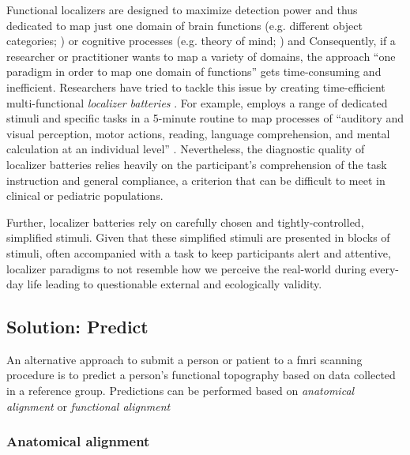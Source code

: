 Functional localizers are designed to maximize detection power and thus
dedicated to map just one domain of brain functions (e.g. different object
categories; \citet{kanwisher1997ffa}) or cognitive processes (e.g. theory of
mind; \citet{spunt2014validating}) and
Consequently, if a researcher or practitioner wants to map a variety of domains,
the approach ``one paradigm in order to map one domain of functions'' gets
time-consuming and inefficient.
Researchers have tried to tackle this issue by creating time-efficient
multi-functional \textit{localizer batteries} \citep{pinel2007fast,
pinho2018individual, pinho2020individual}.
For example, \citet{pinel2007fast} employs a range of dedicated stimuli and
specific tasks in a 5-minute routine to map processes of ``auditory and visual
perception, motor actions, reading, language comprehension, and mental
calculation at an individual level'' \citet{pinel2007fast}.
Nevertheless, the diagnostic quality of localizer batteries relies heavily on
the participant's comprehension of the task instruction and general compliance,
a criterion that can be difficult to meet in clinical or pediatric populations.


Further, localizer batteries rely on carefully chosen and tightly-controlled,
simplified stimuli.
%
Given that these simplified stimuli are presented in blocks of stimuli, often
accompanied with a task to keep participants alert and attentive, localizer
paradigms to not resemble how we perceive the real-world during every-day life
leading to questionable external and ecologically validity.


\subsection{Solution: Predict}

An alternative approach to submit a person or patient to a \ac{fmri} scanning
procedure is to predict a person's functional topography based on data collected
in a reference group. Predictions can be performed based on \textit{anatomical
alignment} or \textit{functional alignment}


\subsubsection{Anatomical alignment}

